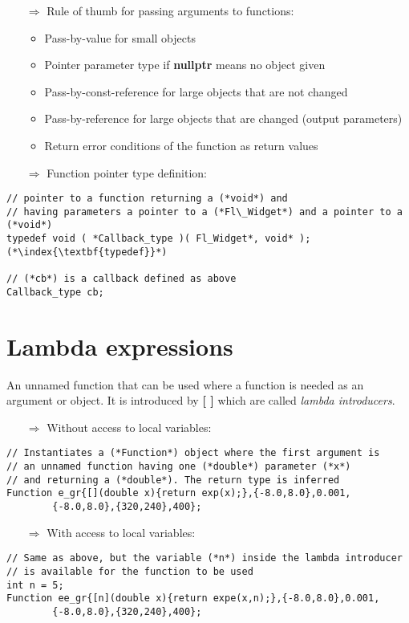 \documentclass[10pt]{article}
\begin{document}
\begin{enumerate}
\item[$\Rightarrow$] Rule of thumb for passing arguments to functions:
\begin{itemize}
\item Pass-by-value for small objects
\item Pointer parameter type if \textbf{nullptr} means no object given
\item Pass-by-const-reference for large objects that are not changed
\item Pass-by-reference for large objects that are changed (output parameters)
\item Return error conditions of the function as return values
\end{itemize}
\end{enumerate}
\begin{enumerate}
\item[$\Rightarrow$] Function pointer type definition:
\end{enumerate}
\begin{lstlisting}
// pointer to a function returning a (*void*) and
// having parameters a pointer to a (*Fl\_Widget*) and a pointer to a (*void*)
typedef void ( *Callback_type )( Fl_Widget*, void* ); (*\index{\textbf{typedef}}*)

// (*cb*) is a callback defined as above
Callback_type cb;
\end{lstlisting}
%
%
\section{Lambda expressions}
\small
An unnamed function that can be used where a function is needed as an argument or object.
It is introduced by \textbf{[ ]} which are called \emph{lambda introducers}.\index{\textbf{[ ]}}
\begin{enumerate}
\item[$\Rightarrow$] Without access to local variables:
\end{enumerate}
\begin{lstlisting}
// Instantiates a (*Function*) object where the first argument is
// an unnamed function having one (*double*) parameter (*x*)
// and returning a (*double*). The return type is inferred
Function e_gr{[](double x){return exp(x);},{-8.0,8.0},0.001,
        {-8.0,8.0},{320,240},400};
\end{lstlisting}
\begin{enumerate}
\item[$\Rightarrow$] With access to local variables:
\end{enumerate}
\begin{lstlisting}
// Same as above, but the variable (*n*) inside the lambda introducer
// is available for the function to be used
int n = 5;
Function ee_gr{[n](double x){return expe(x,n);},{-8.0,8.0},0.001,
        {-8.0,8.0},{320,240},400};
 \end{lstlisting}
%
%
\end{document}
